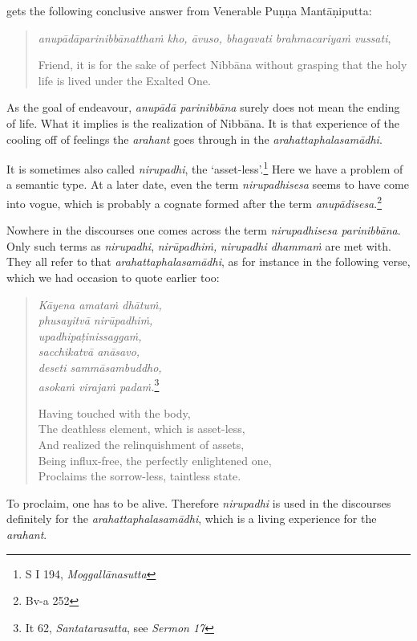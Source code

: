 gets the following conclusive answer from Venerable Puṇṇa Mantāṇiputta:

\begin{quote}
\emph{anupādāparinibbānatthaṁ kho, āvuso, bhagavati brahmacariyaṁ vussati},

Friend, it is for the sake of perfect Nibbāna without grasping that the holy life is lived under the Exalted One.
\end{quote}

As the goal of endeavour, \emph{anupādā parinibbāna} surely does not mean the ending of life. What it implies is the realization of Nibbāna. It is that experience of the cooling off of feelings the \emph{arahant} goes through in the \emph{arahattaphalasamādhi}.

It is sometimes also called \emph{nirupadhi}, the `asset-less'.\footnote{S I 194, \emph{Moggallānasutta}} Here we have a problem of a semantic type. At a later date, even the term \emph{nirupadhisesa} seems to have come into vogue, which is probably a cognate formed after the term \emph{anupādisesa}.\footnote{Bv-a 252}

Nowhere in the discourses one comes across the term \emph{nirupadhisesa parinibbāna}. Only such terms as \emph{nirupadhi}, \emph{nirūpadhiṁ,} \emph{nirupadhi dhammaṁ} are met with. They all refer to that \emph{arahattaphalasamādhi}, as for instance in the following verse, which we had occasion to quote earlier too:

\enlargethispage{\baselineskip}

\begin{quote}
\emph{Kāyena amataṁ dhātuṁ,}\\
\emph{phusayitvā nirūpadhiṁ,}\\
\emph{upadhipaṭinissaggaṁ,}\\
\emph{sacchikatvā anāsavo,}\\
\emph{deseti sammāsambuddho,}\\
\emph{asokaṁ virajaṁ padaṁ.}\footnote{It 62, \emph{Santatarasutta}, see \emph{Sermon 17}}

Having touched with the body,\\
The deathless element, which is asset-less,\\
And realized the relinquishment of assets,\\
Being influx-free, the perfectly enlightened one,\\
Proclaims the sorrow-less, taintless state.
\end{quote}

To proclaim, one has to be alive. Therefore \emph{nirupadhi} is used in the discourses definitely for the \emph{arahattaphalasamādhi}, which is a living experience for the \emph{arahant}.

